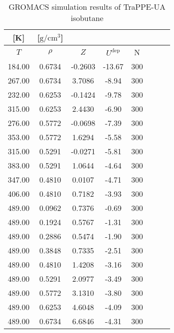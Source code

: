\documentclass[%
 aip,
 jcp,
 sd,%
 amsmath,amssymb,
]{revtex4-1}
\begin{document}
\begin{table*}[!htbp]
\centering
\caption{GROMACS simulation results of TraPPE-UA isobutane}
\label{tab:sim-res-TraPPE-iC4}
\begin{ruledtabular}
\begin{tabular}{cccccccc}
[K] & [$\mathrm{g/cm^3}$] &  &  & \\
\hline
$T$ & $\rho$ & $Z$ & $U^{\mathrm{dep}}$ & N\\
\hline
184.00	&	0.6734	&	-0.2603	&	-13.67	&	300	\\
267.00	&	0.6734	&	3.7086	&	-8.94	&	300	\\
232.00	&	0.6253	&	-0.1424	&	-9.78	&	300	\\
315.00	&	0.6253	&	2.4430	&	-6.90	&	300	\\
276.00	&	0.5772	&	-0.0698	&	-7.39	&	300	\\
353.00	&	0.5772	&	1.6294	&	-5.58	&	300	\\
315.00	&	0.5291	&	-0.0271	&	-5.81	&	300	\\
383.00	&	0.5291	&	1.0644	&	-4.64	&	300	\\
347.00	&	0.4810	&	0.0107	&	-4.71	&	300	\\
406.00	&	0.4810	&	0.7182	&	-3.93	&	300	\\
489.00	&	0.0962	&	0.7376	&	-0.69	&	300	\\
489.00	&	0.1924	&	0.5767	&	-1.31	&	300	\\
489.00	&	0.2886	&	0.5474	&	-1.90	&	300	\\
489.00	&	0.3848	&	0.7335	&	-2.51	&	300	\\
489.00	&	0.4810	&	1.4208	&	-3.16	&	300	\\
489.00	&	0.5291	&	2.0977	&	-3.49	&	300	\\
489.00	&	0.5772	&	3.1310	&	-3.80	&	300	\\
489.00	&	0.6253	&	4.6048	&	-4.09	&	300	\\
489.00	&	0.6734	&	6.6846	&	-4.31	&	300	\\
\end{tabular}
\end{ruledtabular}
\end{table*}
\end{document}
